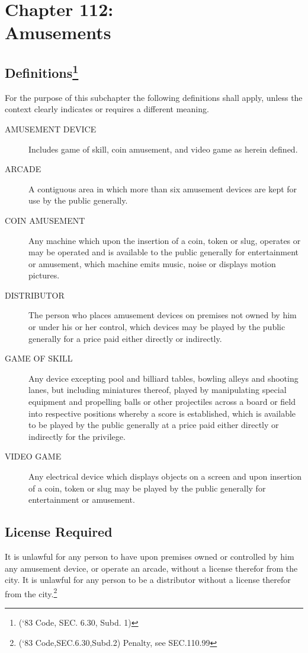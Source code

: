 \chapter*{Chapter 112: \\
	Amusements}
    \minitoc
    \pagebreak


\section{Definitions\footnote{(‘83 Code, SEC. 6.30, Subd. 1)}}
For the purpose of this subchapter the following definitions shall apply, unless the context clearly indicates or requires a different meaning.
\begin{description}
    \item[AMUSEMENT DEVICE] Includes game of skill, coin amusement, and video game as herein defined.
    \item[ARCADE] A contiguous area in which more than six amusement devices are kept for use by the public generally.
    \item[COIN AMUSEMENT] Any machine which upon the insertion of a coin, token or slug, operates or may be operated and is available to the public generally for entertainment or amusement, which machine emits music, noise or displays motion pictures.
    \item[DISTRIBUTOR] The person who places amusement devices on premises not owned by him or under his or her control, which devices may be played by the public generally for a price paid either directly or indirectly.
    \item[GAME OF SKILL] Any device excepting pool and billiard tables, bowling alleys and shooting lanes, but including miniatures thereof, played by manipulating special equipment and propelling balls or other projectiles across a board or field into respective positions whereby a score is established, which is available to be played by the public generally at a price paid either directly or indirectly for the privilege.
    \item[VIDEO GAME] Any electrical device which displays objects on a screen and upon insertion of a coin, token or slug may be played by the public generally for entertainment or amusement.
\end{description}

\section{License Required}
It is unlawful for any person to have upon premises owned or controlled by him any amusement device, or operate an arcade, without a license therefor from the city. It is unlawful for any person to be a distributor without a license therefor from the city.\footnote{(‘83 Code,SEC.6.30,Subd.2) Penalty, see SEC.110.99}


